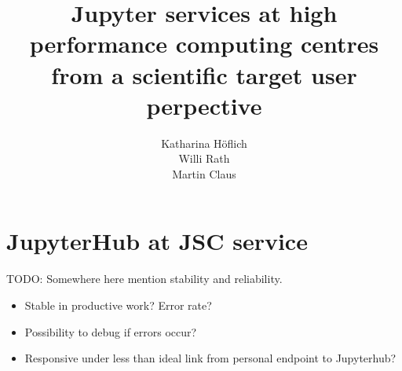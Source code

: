 \documentclass[11pt,a4paper]{article}
\title{\textbf{Jupyter services at high performance computing centres from a scientific target user perpective}}
\author{
	Katharina Höflich\\
	Willi Rath\\
  Martin Claus}
\begin{document}
\maketitle


\tableofcontents


%





\section{JupyterHub at JSC service}









TODO: Somewhere here mention stability and reliability.
\begin{itemize}
	\item Stable in productive work? Error rate?
  \item Possibility to debug if errors occur?
  \item Responsive under less than ideal link from personal endpoint to Jupyterhub?
\end{itemize}












\end{document}
